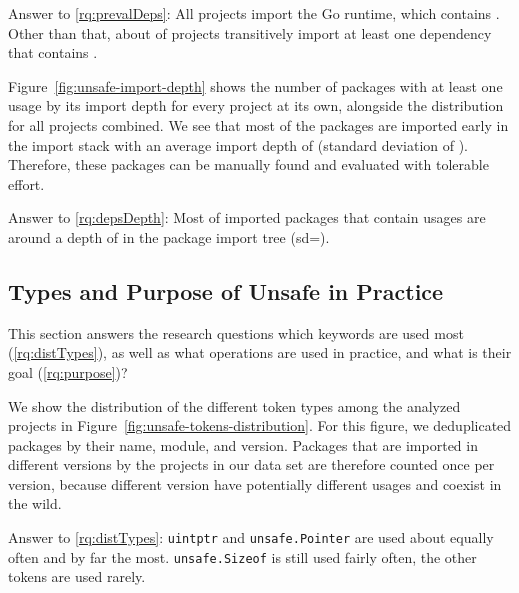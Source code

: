 \begin{tcolorbox}
Answer to \ref{rq:prevalDeps}: All projects import the Go runtime, which contains \unsafe{}. Other than that, about  of projects transitively import at least one dependency that contains \unsafe{}.
\end{tcolorbox}

Figure~\ref{fig:unsafe-import-depth} shows the number of packages with at least one \unsafe{} usage by its import depth for every project at its own, alongside the distribution for all projects combined.
We see that most of the packages are imported early in the import stack with an average import depth of \averageUnsafeImportDepth (standard deviation of \stdUnsafeImportDepth).
Therefore, these packages can be manually found and evaluated with tolerable effort.

\begin{tcolorbox}
Answer to \ref{rq:depsDepth}: Most of imported packages that contain \unsafe{} usages are around a depth of  in the package import tree (sd=).
\end{tcolorbox}


\subsection{Types and Purpose of Unsafe in Practice}

This section answers the research questions which \unsafe{} keywords are used most (\ref{rq:distTypes}), as well as what \unsafe{} operations are used in practice, and what is their goal (\ref{rq:purpose})?

We show the distribution of the different \unsafe{} token types among the analyzed projects in Figure~\ref{fig:unsafe-tokens-distribution}.
For this figure, we deduplicated packages by their name, module, and version. Packages that are imported in different versions by the projects in our data set are therefore counted once per version, because different version have potentially different \unsafe{} usages and coexist in the wild.

\begin{tcolorbox}
Answer to \ref{rq:distTypes}: \texttt{uintptr} and \texttt{unsafe.Pointer} are used about equally often and by far the most. \texttt{unsafe.Sizeof} is still used fairly often, the other \unsafe{} tokens are used rarely.
\end{tcolorbox}



